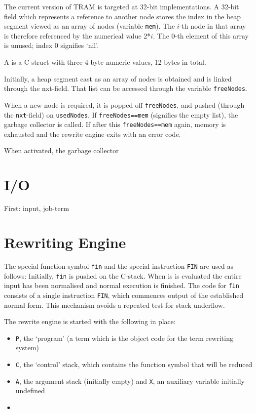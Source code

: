 \documentclass[11pt,twoside]{memoir}
\newcommand{\D}[1]{\index{#1}\defn{#1}}
\def\T{\texttt}
\begin{document}
The current version of TRAM is targeted at 32-bit implementations. A 32-bit field which represents a reference to another node stores the index in the heap segment viewed as an array of nodes (variable \T{mem}). The $i$-th node in that array is therefore referenced by the numerical value 2*$i$. The 0-th element of this array is unused; index 0 signifies `nil'.

A \D{node} is a C-struct with three 4-byte numeric values, 12 bytes in total.

Initially, a heap segment cast as an array of nodes is obtained and is linked through the nxt-field. That list can be accessed through the variable \T{freeNodes}.

When a new node is required, it is popped off \T{freeNodes}, and pushed (through the \T{nxt}-field) on \T{usedNodes}. If \T{freeNodes==mem} (signifies the empty list), the garbage collector is called. If after this \T{freeNodes==mem} again, memory is exhausted and the rewrite engine exits with an error code.

When activated, the garbage collector 




\section{I/O}
First: input, job-term

\section{Rewriting Engine}
\label{sect:re}

The special function symbol \T{fin} and the special instruction \T{FIN} are used as follows: Initially, \T{fin} is pushed on the C-stack. When is is evaluated the entire input has been normalised and normal execution is finished. The code for \T{fin} consists of a single instruction \T{FIN}, which commences output of the established normal form. This mechanism avoids a repeated test for stack underflow.

The rewrite engine is started with the following in place:

\begin{itemize}
	\item \T{P}, the `program' (a term which is the object code for the term rewriting system)
	\item \T{C}, the `control' stack, which contains the function symbol that will be reduced
	\item \T{A}, the argument stack (initially empty) and \T{X}, an auxiliary variable initially undefined
	\item {}
\end{itemize}
\end{document}
